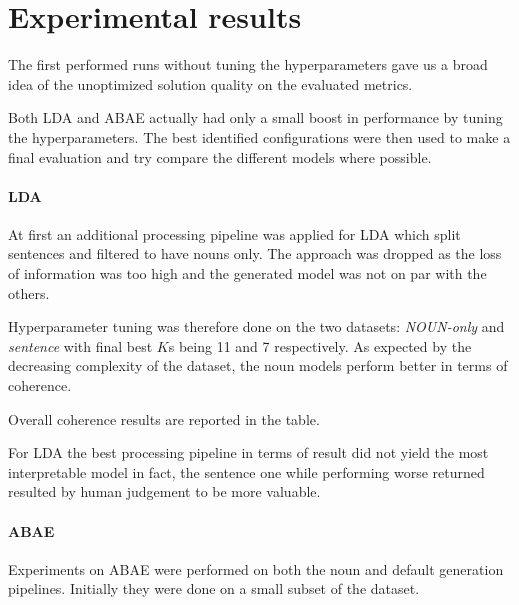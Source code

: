 \section{Experimental results}
The first performed runs without tuning the hyperparameters gave us a broad idea
of the unoptimized solution quality on the evaluated metrics.

Both LDA and ABAE actually had only a small boost in performance by tuning the hyperparameters.
The best identified configurations were then used to make a final evaluation and try compare
the different models where possible.

\paragraph{LDA}
At first an additional processing pipeline was applied for LDA which split sentences and filtered to have nouns only.
The approach was dropped as the loss of information was too high and the generated model was not on par with the others.

Hyperparameter tuning was therefore done on the two datasets: \textit{NOUN-only} and \textit{sentence}
with final best $K$s being 11 and 7 respectively.
As expected by the decreasing complexity of the dataset, the noun models perform better in terms of coherence.

Overall coherence results are reported in the table.

For LDA the best processing pipeline in terms of result did not yield the most interpretable model in fact,
the sentence one while performing worse returned resulted by human judgement to be more valuable.

\paragraph{ABAE}
Experiments on ABAE were performed on both the noun and default generation pipelines.
Initially they were done on a small subset of the dataset.

